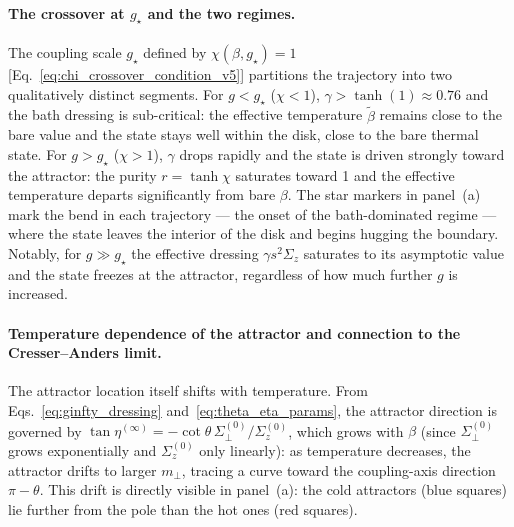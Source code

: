 \paragraph{The crossover at $g_\star$ and the two regimes.}
The coupling scale $g_\star$ defined by $\chi(\beta,g_\star)=1$ [Eq.~\eqref{eq:chi_crossover_condition_v5}]
partitions the trajectory into two qualitatively distinct segments.  For $g<g_\star$
($\chi<1$), $\gamma>\tanh(1)\approx 0.76$ and the bath dressing is sub-critical: the
effective temperature $\tilde\beta$ remains close to the bare value and the state
stays well within the disk, close to the bare thermal state.  For $g>g_\star$
($\chi>1$), $\gamma$ drops rapidly and the state is driven strongly toward the
attractor: the purity $r=\tanh\chi$ saturates toward 1 and the effective temperature
departs significantly from bare $\beta$.  The star markers in panel~(a) mark the
bend in each trajectory — the onset of the bath-dominated regime — where the
state leaves the interior of the disk and begins hugging the boundary.  Notably,
for $g\gg g_\star$ the effective dressing $\gamma s^2\Sigma_z$ saturates to its
asymptotic value and the state freezes at the attractor, regardless of how much
further $g$ is increased.

\paragraph{Temperature dependence of the attractor and connection to the Cresser--Anders limit.}
The attractor location itself shifts with temperature.  From
Eqs.~\eqref{eq:ginfty_dressing} and~\eqref{eq:theta_eta_params}, the attractor
direction is governed by
$\tan\eta^{(\infty)} = -\cot\theta\,\Sigma_\perp^{(0)}/\Sigma_z^{(0)}$,
which grows with $\beta$ (since $\Sigma_\perp^{(0)}$ grows exponentially and
$\Sigma_z^{(0)}$ only linearly): as temperature decreases, the attractor drifts to
larger $m_\perp$, tracing a curve toward the coupling-axis direction $\pi-\theta$.
This drift is directly visible in panel~(a): the cold attractors (blue squares) lie
further from the pole than the hot ones (red squares).

